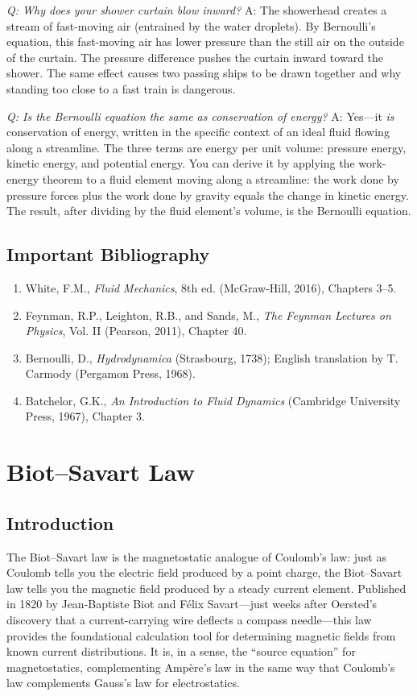 \documentclass[11pt,openright]{book}
\begin{document}
\textit{Q: Why does your shower curtain blow inward?}
A: The showerhead creates a stream of fast-moving air (entrained by the water droplets). By Bernoulli's equation, this fast-moving air has lower pressure than the still air on the outside of the curtain. The pressure difference pushes the curtain inward toward the shower. The same effect causes two passing ships to be drawn together and why standing too close to a fast train is dangerous.

\textit{Q: Is the Bernoulli equation the same as conservation of energy?}
A: Yes---it \emph{is} conservation of energy, written in the specific context of an ideal fluid flowing along a streamline. The three terms are energy per unit volume: pressure energy, kinetic energy, and potential energy. You can derive it by applying the work-energy theorem to a fluid element moving along a streamline: the work done by pressure forces plus the work done by gravity equals the change in kinetic energy. The result, after dividing by the fluid element's volume, is the Bernoulli equation.
\section*{Important Bibliography}
\begin{enumerate}
\item White, F.M., \textit{Fluid Mechanics}, 8th ed. (McGraw-Hill, 2016), Chapters 3--5.
\item Feynman, R.P., Leighton, R.B., and Sands, M., \textit{The Feynman Lectures on Physics}, Vol. II (Pearson, 2011), Chapter 40.
\item Bernoulli, D., \textit{Hydrodynamica} (Strasbourg, 1738); English translation by T. Carmody (Pergamon Press, 1968).
\item Batchelor, G.K., \textit{An Introduction to Fluid Dynamics} (Cambridge University Press, 1967), Chapter 3.
\end{enumerate}


\chapter{Biot--Savart Law}

\section*{Introduction}

The Biot--Savart law is the magnetostatic analogue of Coulomb's law: just as Coulomb tells you the electric field produced by a point charge, the Biot--Savart law tells you the magnetic field produced by a steady current element. Published in 1820 by Jean-Baptiste Biot and Félix Savart---just weeks after Oersted's discovery that a current-carrying wire deflects a compass needle---this law provides the foundational calculation tool for determining magnetic fields from known current distributions. It is, in a sense, the ``source equation'' for magnetostatics, complementing Ampère's law in the same way that Coulomb's law complements Gauss's law for electrostatics.
\end{document}
